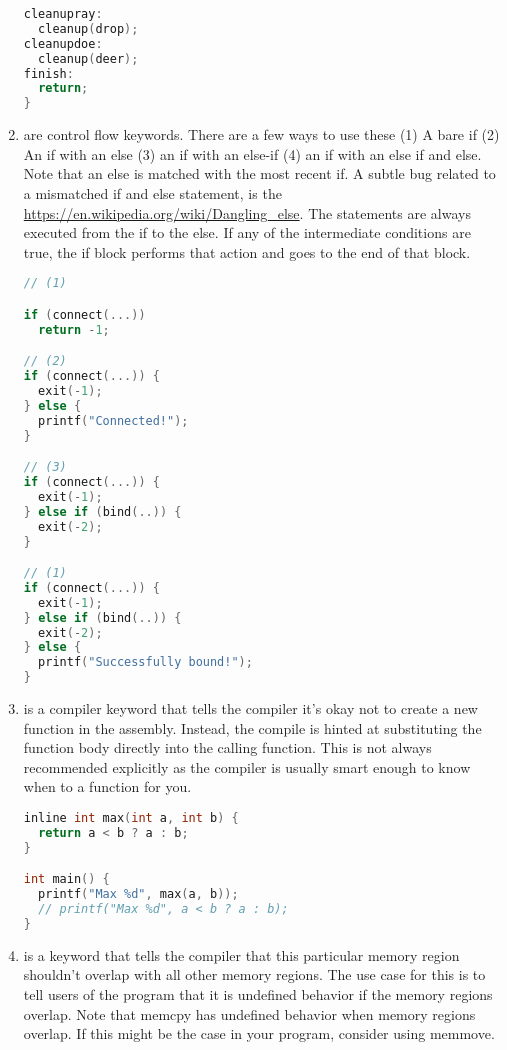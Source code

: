 \begin{enumerate}
\begin{lstlisting}[language=C]
cleanupray:
  cleanup(drop);
cleanupdoe:
  cleanup(deer);
finish:
  return;
}
\end{lstlisting}
	    \item {} are control flow keywords.
        There are a few ways to use these (1) A bare if (2) An if with an else (3) an if with an else-if (4) an if with an else if and else.
        Note that an else is matched with the most recent if. A subtle bug related to a mismatched if and else statement, is the \href{dangling else problem}{https://en.wikipedia.org/wiki/Dangling\_else}.
        The statements are always executed from the if to the else.
        If any of the intermediate conditions are true, the if block performs that action and goes to the end of that block.

	      \begin{lstlisting}[language=C]
// (1)

if (connect(...))
  return -1;

// (2)
if (connect(...)) {
  exit(-1);
} else {
  printf("Connected!");
}

// (3)
if (connect(...)) {
  exit(-1);
} else if (bind(..)) {
  exit(-2);
}

// (1)
if (connect(...)) {
  exit(-1);
} else if (bind(..)) {
  exit(-2);
} else {
  printf("Successfully bound!");
}
\end{lstlisting}

	    \item {} is a compiler keyword that tells the compiler it's okay not to create a new function in the assembly.
        Instead, the compile is hinted at substituting the function body directly into the calling function.
        This is not always recommended explicitly as the compiler is usually smart enough to know when to  a function for you.

	      \begin{lstlisting}[language=C]
inline int max(int a, int b) {
  return a < b ? a : b;
}

int main() {
  printf("Max %d", max(a, b));
  // printf("Max %d", a < b ? a : b);
}
\end{lstlisting}

	    \item {} is a keyword that tells the compiler that this particular memory region shouldn't overlap with all other memory regions.
        The use case for this is to tell users of the program that it is undefined behavior if the memory regions overlap.
        Note that memcpy has undefined behavior when memory regions overlap. If this might be the case in your program, consider using memmove.


\end{enumerate}
